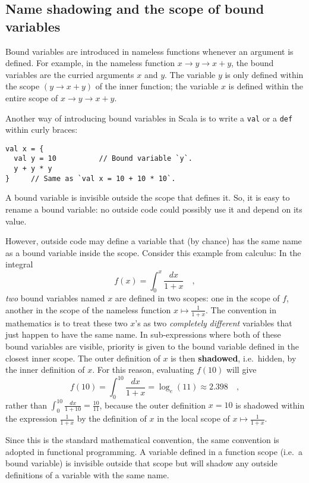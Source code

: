 \subsection{Name shadowing and the scope of bound variables}

Bound variables are introduced in nameless functions whenever an argument
is defined. For example, in the nameless function $x\rightarrow y\rightarrow x+y$,
the bound variables are the curried arguments $x$ and $y$. The variable
$y$ is only defined within the scope $\left(y\rightarrow x+y\right)$
of the inner function; the variable $x$ is defined within the entire
scope of $x\rightarrow y\rightarrow x+y$.

Another way of introducing bound variables in Scala is to write a
\lstinline!val! or a \lstinline!def! within curly braces:
\begin{lstlisting}
val x = {
  val y = 10          // Bound variable `y`.
  y + y * y
}     // Same as `val x = 10 + 10 * 10`.
\end{lstlisting}

A bound variable is invisible outside the scope that defines it. So,
it is easy to rename a bound variable: no outside code could possibly
use it and depend on its value.

However, outside code may define a variable that (by chance) has the
same name as a bound variable inside the scope. Consider this example
from calculus: In the integral
\[
f(x)=\int_{0}^{x}\frac{dx}{1+x}\quad,
\]
\emph{two} bound variables named $x$ are defined in two scopes: one
in the scope of $f$, another in the scope of the nameless function
$x\mapsto\frac{1}{1+x}$. The convention in mathematics is to treat
these two $x$'s as two \emph{completely} \emph{different} variables
that just happen to have the same name. In sub-expressions where both
of these bound variables are visible, priority is given to the bound
variable defined in the closest inner scope. The outer definition
of $x$ is then \textbf{shadowed}, i.e.\ hidden,
by the inner definition of $x$. For this reason, evaluating $f(10)$
will give
\[
f(10)=\int_{0}^{10}\frac{dx}{1+x}=\log_{e}(11)\approx2.398\quad,
\]
rather than $\int_{0}^{10}\frac{dx}{1+10}=\frac{10}{11}$, because
the outer definition $x=10$ is shadowed within the expression $\frac{1}{1+x}$
by the definition of $x$ in the local scope of $x\mapsto\frac{1}{1+x}$.

Since this is the standard mathematical convention, the same convention
is adopted in functional programming. A variable defined in a function
scope (i.e.\ a bound variable) is invisible outside that scope but
will shadow any outside definitions of a variable with the same name.

